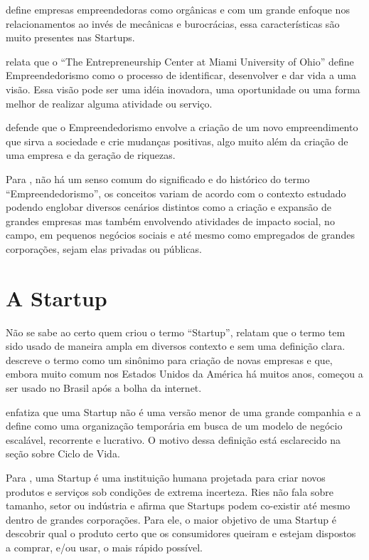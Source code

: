 \cite{Birley1986} define empresas empreendedoras como orgânicas e com um grande enfoque nos relacionamentos ao invés de mecânicas e burocrácias, essa características são muito presentes nas Startups.

\cite{McCall2000} relata que o ``The Entrepreneurship Center at Miami University of Ohio'' define Empreendedorismo como o processo de identificar, desenvolver e dar vida a uma visão. Essa visão pode ser uma idéia inovadora, uma oportunidade ou uma forma melhor de realizar alguma atividade ou serviço.

\cite{Byers2014} defende que o Empreendedorismo envolve a criação de um novo empreendimento que sirva a sociedade e crie mudanças positivas, algo muito além da criação de uma empresa e da geração de riquezas. 

Para \cite{Wallevik2016}, não há um senso comum do significado e do histórico do termo ``Empreendedorismo'', os conceitos variam de acordo com o contexto estudado podendo englobar diversos cenários distintos como a criação e expansão de grandes empresas mas também envolvendo atividades de impacto social, no campo, em pequenos negócios sociais e até mesmo como empregados de grandes corporações, sejam elas privadas ou públicas. 

\section{A Startup}
\label{section:as_startups}

Não se sabe ao certo quem criou o termo ``Startup'', \cite{Miranda2015, Brigidi2009} relatam que o termo tem sido usado de maneira ampla em diversos contexto e sem uma definição clara. \cite{Gitahy2010} descreve o termo como um sinônimo para criação de novas empresas e que, embora muito comum nos Estados Unidos da América há muitos anos, começou a ser usado no Brasil após a bolha da internet.  

\cite{Blank2014} enfatiza que uma Startup não é uma versão menor de uma grande companhia e a define como uma organização temporária em busca de um modelo de negócio escalável, recorrente e lucrativo. O motivo dessa definição está esclarecido na seção sobre Ciclo de Vida.

Para \cite{Ries2011}, uma Startup é uma instituição humana projetada para criar novos produtos e serviços sob condições de extrema incerteza. Ries não fala sobre tamanho, setor ou indústria e afirma que Startups podem co-existir até mesmo dentro de grandes corporações. Para ele, o maior objetivo de uma Startup é descobrir qual o produto certo que os consumidores queiram e estejam dispostos a comprar, e/ou usar, o mais rápido possível.

